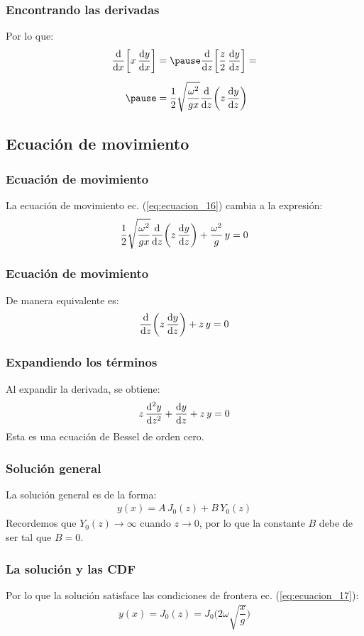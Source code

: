 \documentclass[12pt]{beamer}
\begin{document}
\begin{frame}
\frametitle{Encontrando las derivadas}
Por lo que:
\pause
\begin{eqnarray}
\begin{aligned}[b]
\dv{x} \bigg[x \, \dv{y}{x} \bigg] &= \pause \dv{z} \bigg[ \dfrac{z}{2} \, \dv{y}{z} \bigg] = \\[0.5em] \pause
&= \dfrac{1}{2} \sqrt{\dfrac{\omega^{2}}{g x}} \dv{z} \bigg( z \, \dv{y}{z} \bigg)
\end{aligned}
\label{eq:ecuacion_20}
\end{eqnarray}
\end{frame}

\subsection{Ecuación de movimiento}

\begin{frame}
\frametitle{Ecuación de movimiento}
La ecuación de movimiento ec. (\ref{eq:ecuacion_16}) cambia a la expresión:
\pause
\begin{align}
\dfrac{1}{2} \sqrt{\dfrac{\omega^{2}}{g x}} \dv{z} \bigg( z \, \dv{y}{z} \bigg) + \dfrac{\omega^{2}}{g} \, y = 0
\label{eq:ecuacion_21}
\end{align}
\end{frame}
\begin{frame}
\frametitle{Ecuación de movimiento}
De manera equivalente es:
\pause
\begin{align}
\dv{z} \bigg( z \, \dv{y}{z} \bigg) + z \, y = 0
\label{eq:ecuacion_22}
\end{align}
\end{frame}
\begin{frame}
\frametitle{Expandiendo los términos}
Al expandir la derivada, se obtiene:
\pause
\begin{align}
z \, \dv[2]{y}{z} + \dv{y}{z} + z \, y = 0
\label{eq:ecuacion_23}
\end{align}
\pause
Esta es una ecuación de Bessel de orden cero.
\end{frame}
\begin{frame}
\frametitle{Solución general}
La solución general es de la forma:
\pause
\begin{align*}
y (x) = A \, J_{0} (z) + B \, Y_{0} (z)
\end{align*}
\pause
Recordemos que $Y_{0} (z) \to \infty$ cuando $z \to 0$, por lo que la constante $B$ debe de ser tal que $B = 0$.
\end{frame}
\begin{frame}
\frametitle{La solución y las CDF}
Por lo que la solución satisface las condiciones de frontera ec. (\ref{eq:ecuacion_17}):
\pause
\begin{align}
y (x) = J_{0} (z) = J_{0} \bigg( 2 \omega \sqrt{\dfrac{x}{g}} \bigg)
\label{eq:ecuacion_24}
\end{align}
\end{frame}
\end{document}
